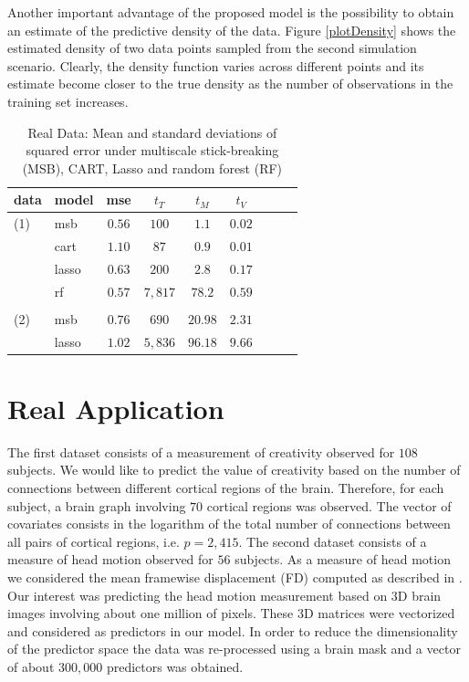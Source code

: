 \documentclass{article}
\begin{document}
Another important advantage of the proposed model is the possibility to obtain an estimate of the predictive density of the data. Figure \ref{plotDensity} shows the estimated density of two data points sampled from the second simulation scenario. Clearly, the density function varies  across different points and its estimate become closer to the true density as the number of observations in the training set increases.


\begin{table}[t]
\caption{Real Data: Mean and standard deviations of squared error under multiscale stick-breaking (MSB), CART, Lasso and random forest (RF)}\label{real}\label{table1}
\vskip 0.15in
\begin{center}
\begin{small}
\begin{sc}
\begin{tabular}{llccccccc}
\hline
\abovespace\belowspace
data  &model&mse&$t_{T}$ & $t_{M}$ & $t_{V}$\\
\hline
\abovespace
\belowspace
(1)&msb &$0.56$ & $100$ & $1.1$& $0.02$\\
 & cart & $1.10$ & $87$ & $0.9$ &$0.01$\\
& lasso & $0.63$  & $200$ & $2.8$ & $0.17$\\
& rf & $0.57$ &  $7,817$ & $78.2$ & $0.59$\\
\\
(2)&msb &$0.76$ & $690$ & $20.98$& $2.31$\\
 & lasso & $1.02$  & $5,836$ & $96.18$ & $9.66$\\
\hline
\end{tabular}
\end{sc}
\end{small}
\end{center}
\vskip -0.1in
\end{table}

\section{Real Application}



The first dataset consists of a measurement of creativity observed for $108$ subjects. We would like to predict the value of creativity based on the number of connections between different cortical regions of the brain. Therefore, for each subject, a brain graph involving $70$ cortical regions was observed. The vector of covariates consists in the logarithm of the total number of connections between all pairs of cortical regions, i.e. $p=2,415$. The second dataset consists of a measure of head motion observed for $56$ subjects. As a measure of head motion we considered the mean framewise displacement (FD) computed as described in \cite{Power}. Our interest was predicting the head motion measurement based on $3$D brain images involving about one million of pixels. These $3$D matrices were vectorized and considered as predictors in our model. In order to reduce the dimensionality of the predictor space the data was re-processed using a brain mask and a vector of about $300,000$ predictors  was obtained.
\end{document}
